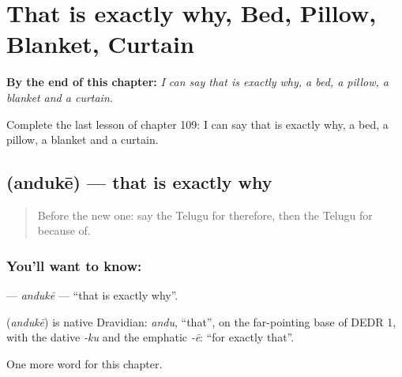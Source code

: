
\chapter{That is exactly why, Bed, Pillow, Blanket, Curtain}
\label{ch:te-that-is-exactly-why-bed-pillow-blanket-curtain}

\begin{chapteropening}
\textbf{By the end of this chapter:} \emph{I can say that is exactly why, a bed, a pillow, a blanket and a curtain.}

Complete the last lesson of chapter 109: I can say that is exactly why, a bed, a pillow, a blanket and a curtain.
\end{chapteropening}

\section[\texorpdfstring{\te{అందుకే} (andukē)}{అందుకే (andukē)}]{ (andukē) — that is exactly why}

\label{lesson:TE-C109-anduke}



\begin{quote}
Before the new one: say the Telugu for therefore, then the Telugu for because of.
\end{quote}

\subsection*{You'll want to know: }
\textbf{} — \emph{andukē} — \textquotedblleft{}that is exactly why\textquotedblright{}.

\begin{cousinweb}
\textbf{} (\emph{andukē}) is native Dravidian: \emph{andu}, \textquotedblleft{}that\textquotedblright{}, on the far-pointing base of DEDR 1, with the dative \emph{-ku} and the emphatic \emph{-ē}: \textquotedblleft{}for exactly that\textquotedblright{}.
\end{cousinweb}

\begin{grammarlens}[title={What you've built}]
One more word for this chapter.
\end{grammarlens}

